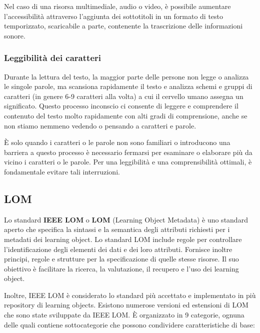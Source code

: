 Nel caso di una risorsa multimediale, audio o video, è possibile aumentare l'accessibilità attraverso l'aggiunta dei sottotitoli in un formato di testo temporizzato, scaricabile a parte, contenente la trascrizione delle informazioni sonore.

\subsubsection{Leggibilità dei caratteri}
Durante la lettura del testo, la maggior parte delle persone non legge o analizza le singole parole, ma scansiona rapidamente il testo e analizza schemi e gruppi di caratteri (in genere 6-9 caratteri alla volta) a cui il cervello umano assegna un significato. Questo processo inconscio ci consente di leggere e comprendere il contenuto del testo molto rapidamente con alti gradi di comprensione, anche se non stiamo nemmeno vedendo o pensando a caratteri e parole.

È solo quando i caratteri o le parole non sono familiari o introducono una barriera a questo processo è necessario fermarsi per esaminare o elaborare più da vicino i caratteri o le parole. Per una leggibilità e una comprensibilità ottimali, è fondamentale evitare tali interruzioni.

\subsection{LOM}
Lo standard \textbf{IEEE LOM} o \textbf{LOM} (Learning Object Metadata) è uno standard aperto che
specifica la sintassi e la semantica degli attributi richiesti per i metadati dei learning object. Lo standard LOM include regole per controllare l'identificazione degli elementi dei dati e dei loro attributi. Fornisce inoltre principi, regole e strutture per la specificazione di quelle stesse risorse. Il suo obiettivo è facilitare la ricerca, la valutazione, il recupero e l'uso dei learning object.

Inoltre, IEEE LOM è considerato lo standard più accettato e implementato in più repository di learning objects. Esistono numerose versioni ed estensioni di LOM che sono state sviluppate da IEEE LOM. È organizzato in 9 categorie, ognuna delle quali contiene sottocategorie che possono condividere caratteristiche di base:


